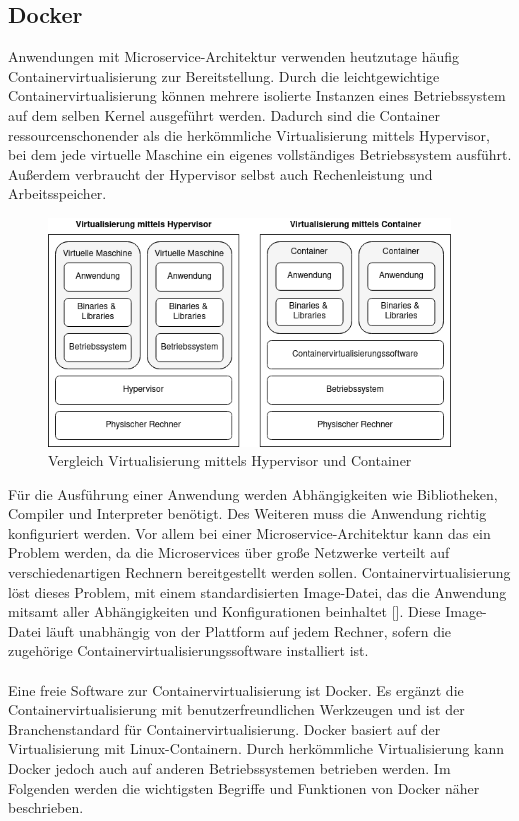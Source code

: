\subsection{Docker}

Anwendungen mit Microservice-Architektur verwenden heutzutage häufig Containervirtualisierung zur Bereitstellung. Durch die leichtgewichtige Containervirtualisierung können mehrere isolierte Instanzen eines Betriebssystem auf dem selben Kernel ausgeführt werden. Dadurch sind die Container ressourcenschonender als die herkömmliche Virtualisierung mittels Hypervisor, bei dem jede virtuelle Maschine ein eigenes vollständiges Betriebssystem ausführt. Außerdem verbraucht der Hypervisor selbst auch Rechenleistung und Arbeitsspeicher.

\begin{figure}[H] 
    \centering
    \includegraphics[width=0.95\textwidth]{figures/containervirtualisierung.png}
    \caption{Vergleich Virtualisierung mittels Hypervisor und Container}
\end{figure}

Für die Ausführung einer Anwendung werden Abhängigkeiten wie Bibliotheken, Compiler und Interpreter benötigt. Des Weiteren muss die Anwendung richtig konfiguriert werden. Vor allem bei einer Microservice-Architektur kann das ein Problem werden, da die Microservices über große Netzwerke verteilt auf verschiedenartigen Rechnern bereitgestellt werden sollen. Containervirtualisierung löst dieses Problem, mit einem standardisierten Image-Datei, das die Anwendung mitsamt aller Abhängigkeiten und Konfigurationen beinhaltet [\cite[S. 9]{arundelCloud2019}]. Diese Image-Datei läuft unabhängig von der Plattform auf jedem Rechner, sofern die zugehörige Containervirtualisierungssoftware installiert ist. \\
\\
Eine freie Software zur Containervirtualisierung ist Docker. Es ergänzt die Containervirtualisierung mit benutzerfreundlichen Werkzeugen  und ist der Branchenstandard für Containervirtualisierung. Docker basiert auf der Virtualisierung mit Linux-Containern. Durch herkömmliche Virtualisierung kann Docker jedoch auch auf anderen Betriebssystemen betrieben werden. Im Folgenden werden die wichtigsten Begriffe und Funktionen von Docker näher beschrieben.

